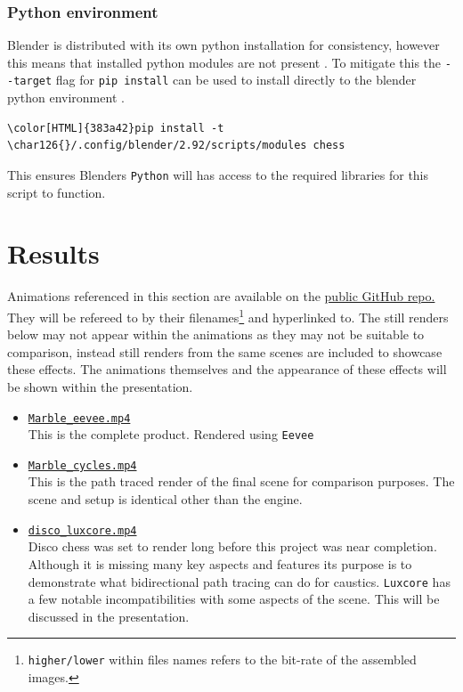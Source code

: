 \documentclass[11pt]{article}
\begin{document}
\subsubsection{Python environment}
\label{sec:org3ee23e6}
Blender is distributed with its own python installation for consistency, however
this means that installed python modules are not present
\cite{blender-python-env}. To mitigate this the \texttt{-{}-target} flag for \texttt{pip install}
can be used to install directly to the blender python environment
\cite{pip-install-man}.
\begin{Code}
\begin{Verbatim}[]
\color[HTML]{383a42}pip install -t \char126{}/.config/blender/2.92/scripts/modules chess
\end{Verbatim}
\end{Code}
This ensures Blenders \texttt{Python} will has access to the required libraries for this
script to function.

\section{Results}
\label{sec:org5d3399f}
Animations referenced in this section are available on the \href{https://github.com/Jake-Moss/blender-chess/tree/master/Videos}{public GitHub repo.}
They will be refereed to by their filenames\footnote{\texttt{higher/lower} within files names refers to the bit-rate of the assembled images.} and hyperlinked to. The still
renders below may not appear within the animations as they may not be suitable
to comparison, instead still renders from the same scenes are included to
showcase these effects. The animations themselves and the appearance of these
effects will be shown within the presentation.

\begin{itemize}
\item \href{https://github.com/Jake-Moss/blender-chess/blob/master/Videos/Marble\_eevee\_higher.mp4}{\texttt{Marble\_eevee.mp4}}\\
This is the complete product. Rendered using \texttt{Eevee}
\item \href{https://github.com/Jake-Moss/blender-chess/blob/master/Videos/Marble\_cycles\_higher.mp4}{\texttt{Marble\_cycles.mp4}}\\
This is the path traced render of the final scene for comparison purposes. The
scene and setup is identical other than the engine.
\item \href{https://github.com/Jake-Moss/blender-chess/blob/master/Videos/disco\_luxcore.mp4}{\texttt{disco\_luxcore.mp4}}\\
Disco chess was set to render long before this project was near completion.
Although it is missing many key aspects and features its purpose is to
demonstrate what bidirectional path tracing can do for caustics. \texttt{Luxcore} has
a few notable incompatibilities with some aspects of the scene. This will be
discussed in the presentation.
\end{itemize}
\end{document}
